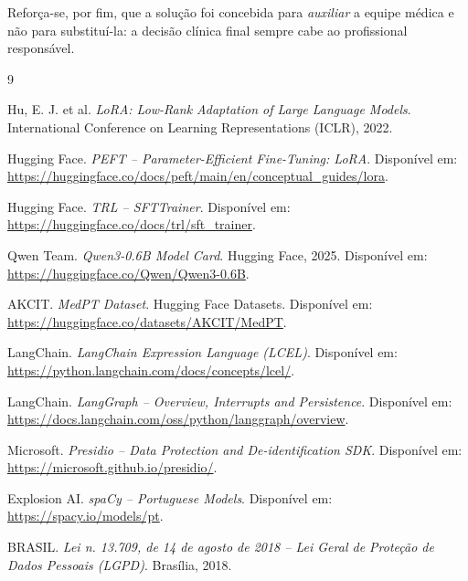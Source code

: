 \documentclass[12pt,a4paper]{article}
\begin{document}
Reforça-se, por fim, que a solução foi concebida para \emph{auxiliar} a equipe
médica e não para substituí-la: a decisão clínica final sempre cabe ao
profissional responsável.

\begin{thebibliography}{9}

 Hu, E. J. et al. \emph{LoRA: Low-Rank Adaptation of Large Language
Models}. International Conference on Learning Representations (ICLR), 2022.

 Hugging Face. \emph{PEFT -- Parameter-Efficient Fine-Tuning: LoRA}.
Disponível em: \url{https://huggingface.co/docs/peft/main/en/conceptual_guides/lora}.

 Hugging Face. \emph{TRL -- SFTTrainer}. Disponível em:
\url{https://huggingface.co/docs/trl/sft_trainer}.

 Qwen Team. \emph{Qwen3-0.6B Model Card}. Hugging Face, 2025.
Disponível em: \url{https://huggingface.co/Qwen/Qwen3-0.6B}.

 AKCIT. \emph{MedPT Dataset}. Hugging Face Datasets. Disponível em:
\url{https://huggingface.co/datasets/AKCIT/MedPT}.

 LangChain. \emph{LangChain Expression Language (LCEL)}.
Disponível em: \url{https://python.langchain.com/docs/concepts/lcel/}.

 LangChain. \emph{LangGraph -- Overview, Interrupts and
Persistence}. Disponível em:
\url{https://docs.langchain.com/oss/python/langgraph/overview}.

 Microsoft. \emph{Presidio -- Data Protection and De-identification
SDK}. Disponível em: \url{https://microsoft.github.io/presidio/}.

 Explosion AI. \emph{spaCy -- Portuguese Models}. Disponível em:
\url{https://spacy.io/models/pt}.

 BRASIL. \emph{Lei n. 13.709, de 14 de agosto de 2018 -- Lei Geral de
Proteção de Dados Pessoais (LGPD)}. Brasília, 2018.

\end{thebibliography}
\end{document}
